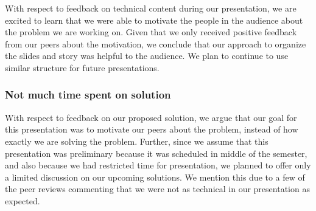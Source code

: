 \documentclass{llcns}
\begin{document}
With respect to feedback on technical content during our presentation, we are excited to learn that we were able to motivate the people in the audience about the problem we are working on.
Given that we only received positive feedback from our peers about the motivation, we conclude that our approach to organize the slides and story was helpful to the audience.
We plan to continue to use similar structure for future presentations.

\subsubsection*{Not much time spent on solution\\}

With respect to feedback on our proposed solution, we argue that our goal for this presentation was to motivate our peers about the problem, instead of how exactly we are solving the problem. 
Further, since we assume that this presentation was preliminary because it was scheduled in middle of the semester, and also because we had restricted time for presentation, we planned to offer only a limited discussion on our upcoming solutions. 
We mention this due to a few of the peer reviews commenting that we were not as technical in our presentation as expected.
\end{document}
